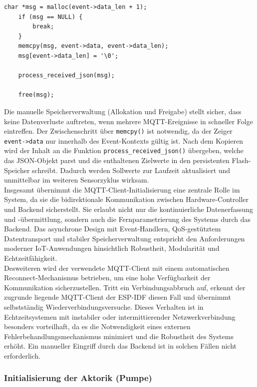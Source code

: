 \begin{lstlisting}[style=cstyle, caption={Empfangen von Solace-Daten}, label={lst:receive_data}]
	char *msg = malloc(event->data_len + 1);
	if (msg == NULL) {
		break;
	}
	memcpy(msg, event->data, event->data_len);
	msg[event->data_len] = '\0';
	
	process_received_json(msg);
	
	free(msg);
\end{lstlisting}
\vspace{1em}
\noindent Die manuelle Speicherverwaltung (Allokation und Freigabe) stellt sicher, dass keine Datenverluste auftreten, wenn mehrere MQTT-Ereignisse in schneller Folge eintreffen. Der Zwischenschritt über \texttt{memcpy()} ist notwendig, da der Zeiger \texttt{event->data} nur innerhalb des Event-Kontexts gültig ist. Nach dem Kopieren wird der Inhalt an die Funktion \texttt{process\_received\_json()} übergeben, welche das JSON-Objekt parst und die enthaltenen Zielwerte in den persistenten Flash-Speicher schreibt. Dadurch werden Sollwerte zur Laufzeit aktualisiert und unmittelbar im weiteren Sensorzyklus wirksam.
\\
Insgesamt übernimmt die MQTT-Client-Initialisierung eine zentrale Rolle im System, da sie die bidirektionale Kommunikation zwischen Hardware-Controller und Backend sicherstellt. Sie erlaubt nicht nur die kontinuierliche Datenerfassung und -übermittlung, sondern auch die Fernparametrierung des Systems durch das Backend. Das asynchrone Design mit Event-Handlern, QoS-gestütztem Datentransport und stabiler Speicherverwaltung entspricht den Anforderungen moderner IoT-Anwendungen hinsichtlich Robustheit, Modularität und Echtzeitfähigkeit. \\
Desweiteren wird der verwendete MQTT-Client mit einem automatischen Reconnect-Mechanismus betrieben, um eine hohe Verfügbarkeit der Kommunikation sicherzustellen. Tritt ein Verbindungsabbruch auf, erkennt der zugrunde liegende MQTT-Client der ESP-IDF diesen Fall und übernimmt selbstständig Wiederverbindungsversuche. Dieses Verhalten ist in Echtzeitsystemen mit instabiler oder intermittierender Netzwerkverbindung besonders vorteilhaft, da es die Notwendigkeit eines externen Fehlerbehandlungsmechanismus minimiert und die Robustheit des Systems erhöht. Ein manueller Eingriff durch das Backend ist in solchen Fällen nicht erforderlich.

\subsubsection{Initialisierung der Aktorik (Pumpe)}

